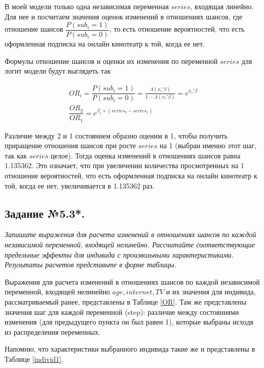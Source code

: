 \documentclass[a4paper,12pt]{article}
\begin{document}
	\vspace{0.2cm}
	
	В моей модели только одна независимая переменная $series$, входящая линейно. Для нее и посчитаем значения оценок изменений в отношениях шансов, где отношение шансов $\dfrac{P(sub_i=1)}{P(sub_i=0)}$, то есть отношение вероятностей, что есть оформленная подписка на онлайн кинотеатр к той, когда ее нет.
	
	Формулы отношение шансов и оценки их изменения по переменной $series$ для логит модели будут выглядеть так
	
	\begin{align*}
		OR_i = \dfrac{P(sub_i=1)}{P(sub_i=0)} = \frac{\Lambda(x_i'\beta)}{1-\Lambda(x_i'\beta)} = e^{x_i'\beta}\\
		\dfrac{OR_2}{OR_1} = e^{\beta_1\times (series_2-series_1)}
	\end{align*} 
	
	Различие между 2 и 1 состоянием образно оценим в 1, чтобы получить приращение отношения шансов при росте $series$ на 1 (выбран именно этот шаг, так как $series$ целое). Тогда оценка изменений в отношениях шансов равна 1.135362. Это означает, что при увеличении количества просмотренных на 1 отношение вероятностей, что есть оформленная подписка на онлайн кинотеатр к той, когда ее нет, увеличивается в 1.135362 раз.
	
		\subsection{Задание №5.3*.}
		\textit{
	Запишите выражения для расчета изменений в отношениях шансов по каждой независимой переменной, входящей нелинейно. Рассчитайте соответствующие предельные эффекты для индивида с произвольными характеристиками. Результаты расчетов представьте в форме таблицы.}
	
	\vspace{0.2cm}
	
	Выражения для расчета изменений в отношениях шансов по каждой независимой переменной, входящей нелинейно $age, internet, TV$ и их значения для индивида, рассматриваемый ранее, представлены в Таблице \ref{OR}. Там же представлены значения шаг для каждой переменной (step): различие между состояниями изменения (для предыдущего пункта он был равен 1), которые выбраны исходя из распределения переменных.
	
	Напомню, что характеристики выбранного индивида такие же и представлены в Таблице \ref{individ1}.
	
\end{document}
